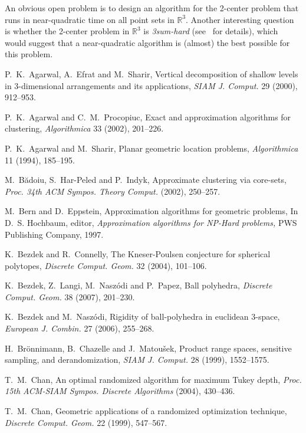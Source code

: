 \documentclass[a4paper,12pt]{article}
\def\reals{\mathbb{R}}
\begin{document}
An obvious open problem is to design an algorithm for the 2-center
problem that runs in near-quadratic time on all point sets in
$\reals^3$.  Another interesting question is whether the 2-center
problem in $\mathbb{R}^3$ is \emph{{\sc 3sum}-hard} (see~\cite{GO}
for details), which would suggest that a near-quadratic algorithm is
(almost) the best possible for this problem.


\begin{thebibliography}{}

P.~K.~Agarwal, A.~Efrat and M.~Sharir,
Vertical decomposition of shallow levels in 3-dimensional arrangements and its applications,
{\it SIAM J. Comput.} 29 (2000), 912--953.

P.~K.~Agarwal and C.~M.~Procopiuc,
Exact and approximation algorithms for clustering,
{\it Algorithmica} 33 (2002), 201--226.

P.~K.~Agarwal and M.~Sharir,
Planar geometric location problems,
{\it Algorithmica} 11 (1994), 185--195.

M.~B\u{a}doiu, S.~Har-Peled and P.~Indyk,
Approximate clustering via core-sets,
{\it Proc. 34th ACM Sympos. Theory Comput.} (2002), 250--257.

M.~Bern and D.~Eppstein,
Approximation algorithms for geometric problems,
In D.~S. Hochbaum, editor, {\it Approximation algorithms for NP-Hard problems,} PWS Publishing Company, 1997.

K.~Bezdek and R.~Connelly,
The Kneser-Poulsen conjecture for spherical polytopes,
{\it Discrete Comput. Geom.} 32 (2004), 101--106.

K.~Bezdek, Z.~Langi, M.~Nasz\'{o}di and P.~Papez,
Ball polyhedra,
{\it Discrete Comput. Geom.} 38 (2007), 201--230.

K.~Bezdek and M.~Nasz\'{o}di,
Rigidity of ball-polyhedra in euclidean 3-space,
{\it European J. Combin.} 27 (2006), 255--268.

H.~Br\"{o}nnimann, B.~Chazelle and J.~Matou\v{s}ek,
Product range spaces, sensitive sampling, and derandomization,
{\it SIAM J. Comput.} 28 (1999), 1552--1575.

T.~M.~Chan,
An optimal randomized algorithm for maximum Tukey depth,
{\it Proc. 15th ACM-SIAM Sympos. Discrete Algorithms} (2004), 430--436.

T.~M.~Chan,
Geometric applications of a randomized optimization technique,
{\it Discrete Comput. Geom.} 22 (1999), 547--567.


\end{thebibliography}
\end{document}
